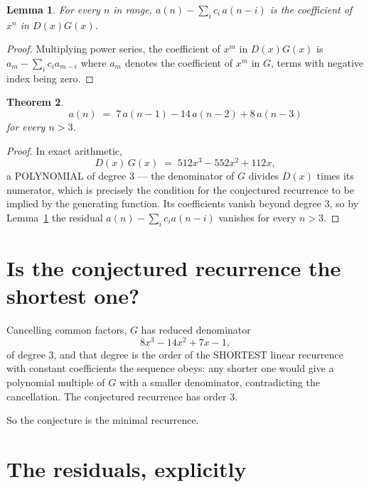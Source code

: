 \documentclass[11pt,a4paper]{article}
\theoremstyle{plain}
\newtheorem{theorem}{Theorem}
\newtheorem{lemma}[theorem]{Lemma}
\theoremstyle{definition}
\begin{document}
\begin{lemma}\label{lem:key}
For every $n$ in range, $a(n)-\sum_i c_i\,a(n-i)$ is the coefficient of $x^{n}$ in
$D(x)G(x)$.
\end{lemma}

\begin{proof}
Multiplying power series, the coefficient of $x^{m}$ in $D(x)G(x)$ is
$a_m-\sum_i c_i a_{m-i}$ where $a_m$ denotes the coefficient of $x^{m}$ in $G$, terms with
negative index being zero.
\end{proof}

\begin{theorem}
\[
a(n)\;=\;7\,a(n-1) - 14\,a(n-2) + 8\,a(n-3)
\]
for every $n>3$.
\end{theorem}

\begin{proof}
In exact arithmetic,
\[
D(x)\,G(x)\;=\;512 x^{3} - 552 x^{2} + 112 x,
\]
a POLYNOMIAL of degree $3$ --- the denominator of $G$ divides $D(x)$ times its numerator,
which is precisely the condition for the conjectured recurrence to be implied by the
generating function. Its coefficients vanish beyond degree $3$, so by
Lemma~\ref{lem:key} the residual $a(n)-\sum_ic_ia(n-i)$ vanishes for every
$n>3$.
\end{proof}

\section{Is the conjectured recurrence the shortest one?}

Cancelling common factors, $G$ has reduced denominator
\[
8 x^{3} - 14 x^{2} + 7 x - 1,
\]
of degree $3$, and that degree is the order of the SHORTEST linear recurrence with
constant coefficients the sequence obeys: any shorter one would give a polynomial multiple of
$G$ with a smaller denominator, contradicting the cancellation. The conjectured recurrence has
order $3$.

So the conjecture is the minimal recurrence.

\section{The residuals, explicitly}
\end{document}
